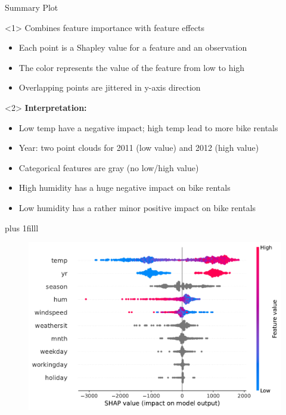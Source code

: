 \documentclass[11pt,compress,t,notes=noshow, aspectratio=169, xcolor=table]{beamer}
\newcommand{\btVFill}{\vskip0pt plus 1filll}
\begin{document}
\begin{frame}{Summary Plot}
\begin{onlyenv}<1>
Combines feature importance with feature effects
\begin{itemize}
    \item Each point is a Shapley value for a feature and an observation
    \item The color represents the value of the feature from low to high
    \item Overlapping points are jittered in y-axis direction
\end{itemize}
\end{onlyenv}

\begin{onlyenv}<2>
\textbf{Interpretation:}\\
\begin{itemize}
    \item Low temp have a negative impact; high temp lead to more bike rentals
    \item Year: two point clouds for 2011 (low value) and 2012 (high value)\\
    \item Categorical features are gray (no low/high value)
    \item High humidity has a huge negative impact on bike rentals
    \item Low humidity has a rather minor positive impact on bike rentals
\end{itemize}
 
\end{onlyenv}

\btVFill

\begin{figure}
    \centering
    \includegraphics[width=0.5\columnwidth]{figure_man/global_shap_jitter.pdf}
    
\end{figure}
\end{frame} 

\end{document}
